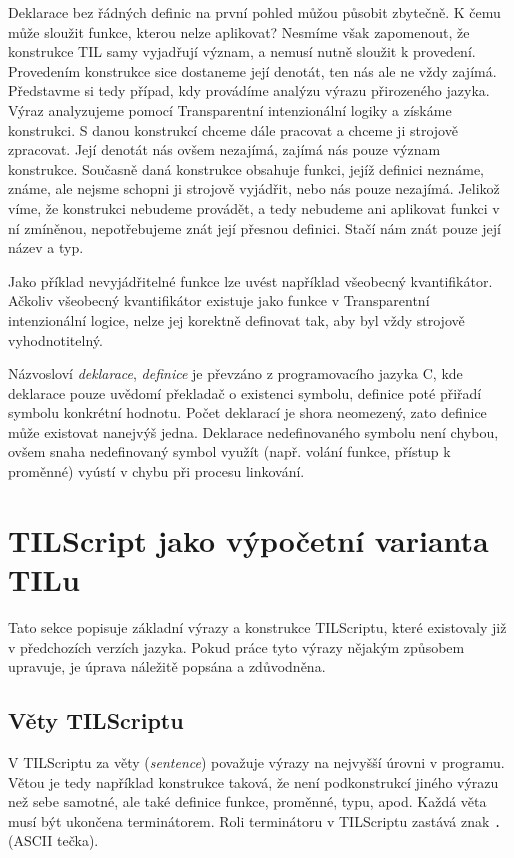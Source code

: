 Deklarace bez řádných definic na první pohled můžou působit zbytečně. K čemu může sloužit funkce,
kterou nelze aplikovat? Nesmíme však zapomenout, že konstrukce TIL samy vyjadřují význam, a nemusí
nutně sloužit k provedení. Provedením konstrukce sice dostaneme její denotát, ten nás ale ne vždy
zajímá. Představme si tedy případ, kdy provádíme analýzu výrazu přirozeného jazyka. Výraz
analyzujeme pomocí Transparentní intenzionální logiky a získáme konstrukci. S danou konstrukcí
chceme dále pracovat a chceme ji strojově zpracovat. Její denotát nás ovšem nezajímá, zajímá nás
pouze význam konstrukce. Současně daná konstrukce obsahuje funkci, jejíž definici neznáme, známe,
ale nejsme schopni ji strojově vyjádřit, nebo nás pouze nezajímá. Jelikož víme, že konstrukci
nebudeme provádět, a tedy nebudeme ani aplikovat funkci v ní zmíněnou, nepotřebujeme znát její
přesnou definici. Stačí nám znát pouze její název a typ.

Jako příklad nevyjádřitelné funkce lze uvést například všeobecný kvantifikátor. Ačkoliv všeobecný
kvantifikátor existuje jako funkce v Transparentní intenzionální logice, nelze jej korektně
definovat tak, aby byl vždy strojově vyhodnotitelný.

Názvosloví \textit{deklarace}, \textit{definice} je převzáno z programovacího jazyka C, kde
deklarace pouze uvědomí překladač o existenci symbolu, definice poté přiřadí symbolu konkrétní
hodnotu. Počet deklarací je shora neomezený, zato definice může existovat nanejvýš jedna. Deklarace
nedefinovaného symbolu není chybou, ovšem snaha nedefinovaný symbol využít (např. volání funkce,
přístup k proměnné) vyústí v chybu při procesu linkování.

\section{TILScript jako výpočetní varianta TILu}

Tato sekce popisuje základní výrazy a konstrukce TILScriptu, které existovaly již v předchozích
verzích jazyka. Pokud práce tyto výrazy nějakým způsobem upravuje, je úprava náležitě popsána
a zdůvodněna.

\subsection{Věty TILScriptu}

V TILScriptu za věty (\textit{sentence}) považuje výrazy na nejvyšší úrovni v programu. Větou je
tedy například konstrukce taková, že není podkonstrukcí jiného výrazu než sebe samotné, ale také
definice funkce, proměnné, typu, apod. Každá věta musí být ukončena terminátorem. Roli terminátoru
v TILScriptu zastává znak \lstinline{.} (ASCII tečka).

